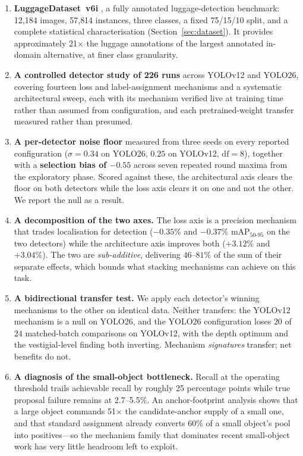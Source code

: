 \documentclass[10pt,twocolumn,a4paper]{article}
\begin{document}
\begin{enumerate}[leftmargin=1.2em,itemsep=2pt,topsep=3pt]
\item \textbf{LuggageDataset~v6i} \cite{luggagedataset}, a fully annotated
luggage-detection benchmark:
12{,}184 images, 57{,}814 instances, three classes, a fixed 75/15/10 split, and a
complete statistical characterisation (Section~\ref{sec:dataset}). It provides
approximately 21$\times$ the luggage annotations of the largest annotated
in-domain alternative, at finer class granularity.

\item \textbf{A controlled detector study of 226 runs} across YOLOv12 and YOLO26,
covering fourteen loss and label-assignment mechanisms and a systematic
architectural sweep, each with its mechanism verified live at training time
rather than assumed from configuration, and each pretrained-weight transfer
measured rather than presumed.

\item \textbf{A per-detector noise floor} measured from three seeds on every
reported configuration ($\sigma = 0.34$ on YOLO26, $0.25$ on YOLOv12,
$\mathrm{df}=8$), together with a \textbf{selection bias of $-0.55$} across
seven repeated round maxima from the exploratory phase. Scored against these,
the architectural axis clears the floor on both detectors while the loss axis
clears it on one and not the other. We report the null as a result.

\item \textbf{A decomposition of the two axes.} The loss axis is a precision
mechanism that trades localisation for detection ($-0.35\%$ and $-0.37\%$
mAP$_{50\text{-}95}$ on the two detectors) while the architecture axis improves
both ($+3.12\%$ and $+3.04\%$).
The two are \emph{sub-additive}, delivering $46$--$81\%$ of the sum of their
separate effects, which bounds what stacking mechanisms can achieve on this task.

\item \textbf{A bidirectional transfer test.} We apply each detector's winning
mechanisms to the other on identical data. Neither transfers: the YOLOv12
mechanism is a null on YOLO26, and the YOLO26 configuration loses $20$ of $24$
matched-batch comparisons on YOLOv12, with the depth optimum and the
vestigial-level finding both inverting. Mechanism \emph{signatures} transfer;
net benefits do not.

\item \textbf{A diagnosis of the small-object bottleneck.} Recall at the operating
threshold trails achievable recall by roughly 25 percentage points while true
proposal failure remains at 2.7--5.5\%. An anchor-footprint analysis shows that a
large object commands 51$\times$ the candidate-anchor supply of a small one, and
that standard assignment already converts 60\% of a small object's pool into
positives---so the mechanism family that dominates recent small-object work has
very little headroom left to exploit.


\end{enumerate}
\end{document}
